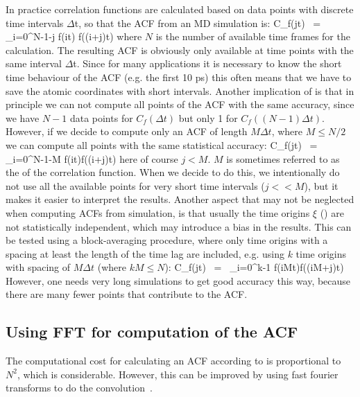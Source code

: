 In practice correlation functions are calculated based on data points with
discrete time intervals {$\Delta$t}, so that the ACF from an MD simulation is:
\beq
C_f(j\Delta t)	~=~	\sum_{i=0}^{N-1-j} f(i\Delta t) f((i+j)\Delta t)
\label{eqn:corrmd}
\eeq
where $N$ is the number of available time frames for the calculation.
The resulting ACF is
obviously only available at time points with the same interval {$\Delta$t}.
Since for many applications it is necessary to know  the short time behaviour
of the ACF (e.g. the first 10 ps) this often means that we have to save the
atomic coordinates with short intervals.
Another implication of  is that in principle we can not compute
all points of the ACF with the same accuracy, since we have $N-1$ data points
for $C_f(\Delta t)$ but only 1 for $C_f((N-1)\Delta t)$. However, if we decide to
compute only an ACF of length $M\Delta t$, where $M \leq N/2$ we can compute 
all points with the same statistical accuracy:
\beq
C_f(j\Delta t)	~=~ \sum_{i=0}^{N-1-M} f(i\Delta t)f((i+j)\Delta t)
\eeq
here of course $j < M$.
$M$ is sometimes referred to as the  of the correlation function. 
When we decide to do this, we intentionally do not use all the available points
for very short time intervals ($j << M$), but it makes it easier to interpret
the results.
Another aspect that may not be neglected when computing
ACFs from simulation, is that usually the time origins $\xi$ ()
are not statistically independent, which may introduce a bias in the results.
This can be tested using a block-averaging procedure, where only time origins
with a spacing at least the length of the time lag are included, e.g. using 
$k$ time origins with spacing of $M\Delta t$ (where $kM \leq N$):
\beq
C_f(j\Delta t)	~=~ \sum_{i=0}^{k-1} f(iM\Delta t)f((iM+j)\Delta t)
\eeq
However, one
needs very long simulations to get good accuracy this way, because there are 
many fewer points that contribute to the ACF.

\subsection{Using FFT for computation of the ACF}
The computational cost for calculating an ACF according to 
is proportional to $N^2$, which is considerable. However, this can be improved
by using fast fourier transforms to do the convolution~\cite{Allen87}.

